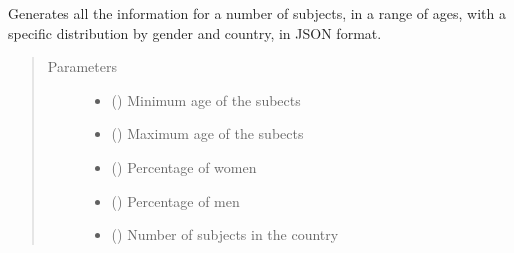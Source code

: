 \documentclass[letterpaper,10pt,english]{sphinxmanual}
\begin{document}
\begin{fulllineitems}
\label{\detokenize{CE_app.synth_phr:CE_app.synth_phr.subjects_creation.func_nihpo_subjects_creation_in_provinces}}
\sphinxAtStartPar
Generates all the information for a number of subjects, in a range of ages, with a specific distribution by gender and country, in JSON format.
\begin{quote}\begin{description}
\item[{Parameters}] \leavevmode\begin{itemize}
\item {} 
\sphinxAtStartPar
{} () \textendash{} Minimum age of the subects

\item {} 
\sphinxAtStartPar
{} () \textendash{} Maximum age of the subects

\item {} 
\sphinxAtStartPar
{} (\sphinxstyleliteralemphasis{\sphinxupquote{ (}}\sphinxstyleliteralemphasis{\sphinxupquote{)}}) \textendash{} Percentage of women

\item {} 
\sphinxAtStartPar
{} (\sphinxstyleliteralemphasis{\sphinxupquote{ (}}\sphinxstyleliteralemphasis{\sphinxupquote{)}}) \textendash{} Percentage of men

\item {} 
\sphinxAtStartPar
{} (\sphinxstyleliteralemphasis{\sphinxupquote{ (}}\sphinxstyleliteralemphasis{\sphinxupquote{, }}\sphinxstyleliteralemphasis{\sphinxupquote{) }}\sphinxstyleliteralemphasis{\sphinxupquote{ (}}\sphinxstyleliteralemphasis{\sphinxupquote{, }}\sphinxstyleliteralemphasis{\sphinxupquote{)}}) \textendash{} Number of subjects in the country


\end{itemize}
\end{description}
\end{quote}
\end{fulllineitems}
\end{document}
